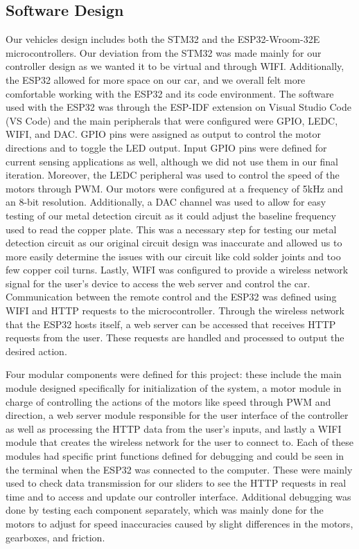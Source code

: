 \documentclass[11pt]{article}
\begin{document}
\subsection{Software Design}
Our vehicles design includes both the STM32 and the ESP32-Wroom-32E microcontrollers. Our deviation from the STM32 was made mainly for our controller design as we wanted it to be virtual and through WIFI. Additionally, the ESP32 allowed for more space on our car, and we overall felt more comfortable working with the ESP32 and its code environment. The software used with the ESP32 was through the ESP-IDF extension on Visual Studio Code (VS Code) and the main peripherals that were configured were GPIO, LEDC, WIFI, and DAC. GPIO pins were assigned as output to control the motor directions and to toggle the LED output. Input GPIO pins were defined for current sensing applications as well, although we did not use them in our final iteration. Moreover, the LEDC peripheral was used to control the speed of the motors through PWM. Our motors were configured at a frequency of 5kHz and an 8-bit resolution. Additionally, a DAC channel was used to allow for easy testing of our metal detection circuit as it could adjust the baseline frequency used to read the copper plate. This was a necessary step for testing our metal detection circuit as our original circuit design was inaccurate and allowed us to more easily determine the issues with our circuit like cold solder joints and too few copper coil turns. Lastly, WIFI was configured to provide a wireless network signal for the user’s device to access the web server and control the car. Communication between the remote control and the ESP32 was defined using WIFI and HTTP requests to the microcontroller. Through the wireless network that the ESP32 hosts itself, a web server can be accessed that receives HTTP requests from the user. These requests are handled and processed to output the desired action. 

Four modular components were defined for this project: these include the main module designed specifically for initialization of the system, a motor module in charge of controlling the actions of the motors like speed through PWM and direction, a web server module responsible for the user interface of the controller as well as processing the HTTP data from the user’s inputs, and lastly a WIFI module that creates the wireless network for the user to connect to. Each of these modules had specific print functions defined for debugging and could be seen in the terminal when the ESP32 was connected to the computer. These were mainly used to check data transmission for our sliders to see the HTTP requests in real time and to access and update our controller interface. Additional debugging was done by testing each component separately, which was mainly done for the motors to adjust for speed inaccuracies caused by slight differences in the motors, gearboxes, and friction. 
\end{document}
